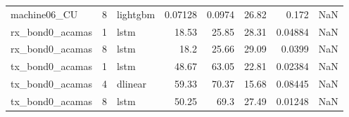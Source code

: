 \begin{table}
\begin{tabular}{lrlrrrrr}
machine06_CU & 8 & lightgbm & 0.07128 & 0.0974 & 26.82 & 0.172 & NaN \\
rx_bond0_acamas & 1 & lstm & 18.53 & 25.85 & 28.31 & 0.04884 & NaN \\
rx_bond0_acamas & 8 & lstm & 18.2 & 25.66 & 29.09 & 0.0399 & NaN \\
tx_bond0_acamas & 1 & lstm & 48.67 & 63.05 & 22.81 & 0.02384 & NaN \\
tx_bond0_acamas & 4 & dlinear & 59.33 & 70.37 & 15.68 & 0.08445 & NaN \\
tx_bond0_acamas & 8 & lstm & 50.25 & 69.3 & 27.49 & 0.01248 & NaN \\
\bottomrule
\end{tabular}
\end{table}
